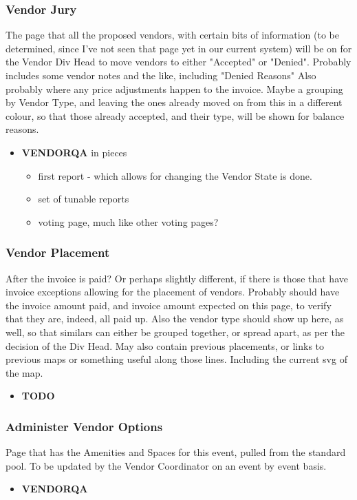 \documentclass[captions=tablesignature]{scrartcl}
\begin{document}
\subsubsection{Vendor Jury}
\label{sec-3-1-10}
The page that all the proposed vendors, with certain bits of
information (to be determined, since I've not seen that page yet
in our current system) will be on for the Vendor Div Head to move
vendors to either "Accepted" or "Denied".  Probably includes some
vendor notes and the like, including "Denied Reasons" Also
probably where any price adjustments happen to the invoice.  Maybe
a grouping by Vendor Type, and leaving the ones already moved on
from this in a different colour, so that those already accepted,
and their type, will be shown for balance reasons.
\begin{itemize}
\item {\bfseries\sffamily VENDORQA} in pieces
\label{sec-3-1-10-1}
\begin{itemize}
\item first report - which allows for changing the Vendor State is
done.
\item set of tunable reports
\item voting page, much like other voting pages?
\end{itemize}
\end{itemize}

\subsubsection{Vendor Placement}
\label{sec-3-1-11}
After the invoice is paid? Or perhaps slightly different, if there
is those that have invoice exceptions allowing for the placement
of vendors.  Probably should have the invoice amount paid, and
invoice amount expected on this page, to verify that they are,
indeed, all paid up.  Also the vendor type should show up here, as
well, so that similars can either be grouped together, or spread
apart, as per the decision of the Div Head. May also contain
previous placements, or links to previous maps or something useful
along those lines.  Including the current svg of the map.
\begin{itemize}
\item {\bfseries\sffamily TODO} 
\label{sec-3-1-11-1}
\end{itemize}

\subsubsection{Administer Vendor Options}
\label{sec-3-1-12}
Page that has the Amenities and Spaces for this event, pulled from
the standard pool.  To be updated by the Vendor Coordinator on an
event by event basis.
\begin{itemize}
\item {\bfseries\sffamily VENDORQA} 
\label{sec-3-1-12-1}
\end{itemize}
\end{document}
